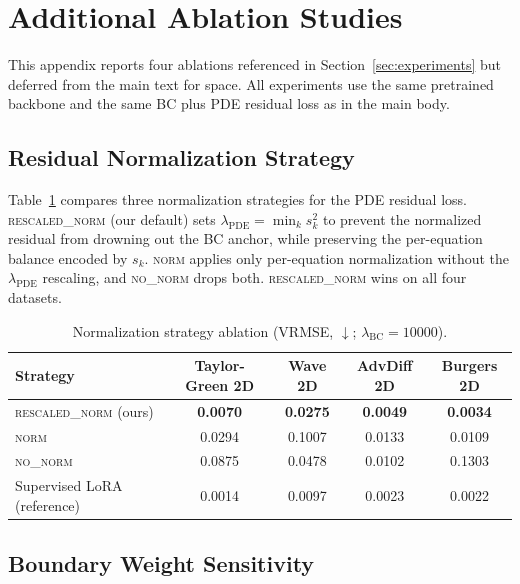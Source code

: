 \documentclass{article}
\begin{document}




\appendix

\section{Additional Ablation Studies}
\label{app:ablations}

This appendix reports four ablations referenced in Section~\ref{sec:experiments} but deferred from the main text for space. All experiments use the same pretrained backbone and the same BC plus PDE residual loss as in the main body.

\subsection{Residual Normalization Strategy}
\label{app:norm}

Table~\ref{tab:app_norm} compares three normalization strategies for the PDE residual loss. \textsc{rescaled\_norm} (our default) sets $\lambda_{\mathrm{PDE}} = \min_k s_k^2$ to prevent the normalized residual from drowning out the BC anchor, while preserving the per-equation balance encoded by $s_k$. \textsc{norm} applies only per-equation normalization without the $\lambda_{\mathrm{PDE}}$ rescaling, and \textsc{no\_norm} drops both. \textsc{rescaled\_norm} wins on all four datasets.

\begin{table}[h]
\centering
\caption{Normalization strategy ablation (VRMSE, $\downarrow$; $\lambda_{\mathrm{BC}}=10000$).}
\label{tab:app_norm}
\begin{tabular}{lcccc}
\toprule
Strategy & Taylor-Green 2D & Wave 2D & AdvDiff 2D & Burgers 2D \\
\midrule
\textsc{rescaled\_norm} (ours) & \textbf{0.0070} & \textbf{0.0275} & \textbf{0.0049} & \textbf{0.0034} \\
\textsc{norm} & 0.0294 & 0.1007 & 0.0133 & 0.0109 \\
\textsc{no\_norm} & 0.0875 & 0.0478 & 0.0102 & 0.1303 \\
\midrule
Supervised LoRA (reference) & 0.0014 & 0.0097 & 0.0023 & 0.0022 \\
\bottomrule
\end{tabular}
\end{table}

\subsection{Boundary Weight Sensitivity}
\label{app:lambda_bc}
\end{document}
